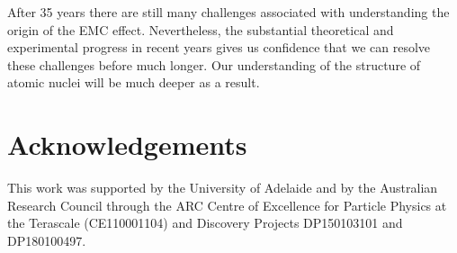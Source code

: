 \documentclass{ws-ijmpe}
\begin{document}
After 35 years there are still many challenges associated with understanding the origin of the EMC effect. Nevertheless, the substantial theoretical and experimental progress in recent years gives us confidence that we can resolve these challenges before much longer. Our understanding of the structure of atomic nuclei will be much deeper as a result.

\section*{Acknowledgements}

This work was supported by the University of Adelaide and by the Australian Research Council through the 
ARC Centre of Excellence for Particle Physics at the Terascale (CE110001104) and Discovery Projects 
DP150103101 and DP180100497.
\end{document}
